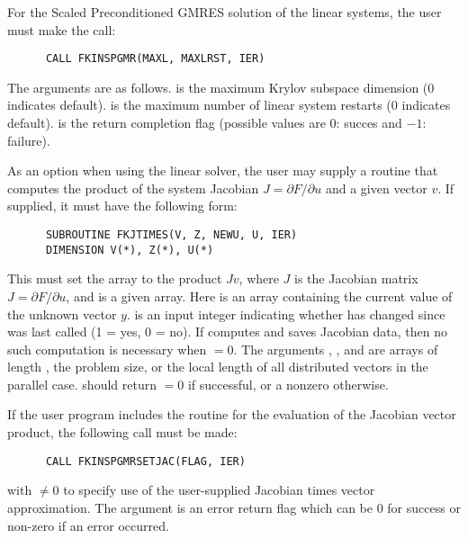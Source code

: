 \begin{Steps}
  For the Scaled Preconditioned GMRES solution of the linear systems,
  the user must make the call:
\begin{verbatim}
      CALL FKINSPGMR(MAXL, MAXLRST, IER)
\end{verbatim}
  The arguments are as follows.
   is the maximum Krylov subspace dimension ($0$ indicates default).
   is the maximum number of linear system restarts ($0$ indicates
  default).
   is the return completion flag (possible values are $0$: succes and
  $-1$: failure).
    
  As an option when using the {\spgmr} linear solver, the user may supply a 
  routine that computes the product of the system Jacobian 
  $J = \partial F / \partial u$ 
  and a given vector $v$.  If supplied, it must have the following form:
\begin{verbatim}
      SUBROUTINE FKJTIMES(V, Z, NEWU, U, IER)
      DIMENSION V(*), Z(*), U(*)
\end{verbatim}
  This must set the array  to the product $Jv$, where $J$ is the Jacobian
  matrix $J = \partial F/ \partial u$, and  is a given array. 
  Here  is an array containing
  the current value of the unknown vector $y$.  is an input integer 
  indicating whether  has changed since  was last called 
  (1 = yes, 0 = no). If  computes and saves Jacobian data, then 
  no such computation is necessary when  $= 0$. 
  The arguments , , and  are 
  arrays of length , the problem size, or the local length of all 
  distributed vectors in the parallel case.  should return 
   $= 0$ if successful, or a nonzero  otherwise.
  
  If the user program includes the  routine for the evaluation
  of the Jacobian vector product, the following call must be made:
\begin{verbatim}
      CALL FKINSPGMRSETJAC(FLAG, IER)
\end{verbatim}
  with  $\neq 0$ to specify use of the user-supplied Jacobian times
  vector approximation.
  The argument  is an error return flag which can be $0$ 
  for success or non-zero if an error occurred.
  

\end{Steps}
